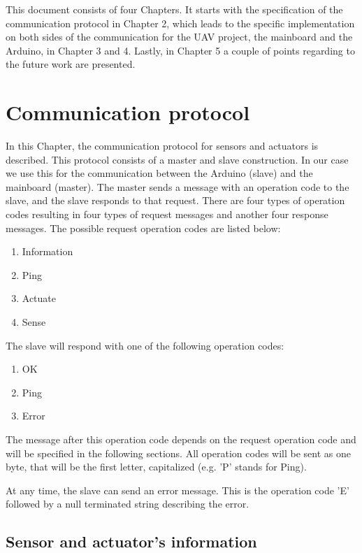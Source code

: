 \documentclass[11pt,a4paper,oneside]{book}
\begin{document}
This document consists of four Chapters. It starts with the specification of the communication protocol in Chapter 2, which leads to the specific implementation on both sides of the communication for the UAV project, the mainboard and the Arduino, in Chapter 3 and 4. Lastly, in Chapter 5 a couple of points regarding to the future work are presented.


\chapter{Communication protocol}

In this Chapter, the communication protocol for sensors and actuators is described. This protocol consists of a master and slave construction. In our case we use this for the communication between the Arduino (slave) and the mainboard (master). The master sends a message with an operation code to the slave, and the slave responds to that request. There are four types of operation codes resulting in four types of request messages and another four response messages. The possible request operation codes are listed below:

\begin{enumerate}
\item Information
\item Ping
\item Actuate
\item Sense
\end{enumerate}

The slave will respond with one of the following operation codes:
\begin{enumerate}
\item OK
\item Ping
\item Error
\end{enumerate}

The message after this operation code depends on the request operation code and will be specified in the following sections. All operation codes will be sent as one byte, that will be the first letter, capitalized (e.g. 'P' stands for Ping).

At any time, the slave can send an error message. This is the operation code 'E' followed by a null terminated string describing the error.

\section{Sensor and actuator's information}
\end{document}
